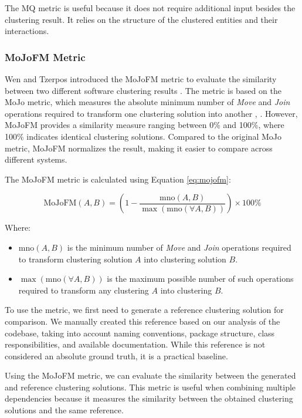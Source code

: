 \documentclass{ieeeaccess}
\begin{document}
The MQ metric is useful because it does not require additional input besides the clustering result. It relies on the structure of the clustered entities and their interactions.

\subsubsection{MoJoFM Metric}
\label{subsec:mojofm}
Wen and Tzerpos introduced the MoJoFM metric to evaluate the similarity between two different software clustering results \cite{mojofm}. The metric is based on the MoJo metric, which measures the absolute minimum number of \textit{Move} and \textit{Join} operations required to transform one clustering solution into another \cite{b3}, \cite{mojofm}. However, MoJoFM provides a similarity measure ranging between 0\% and 100\%, where 100\% indicates identical clustering solutions.
Compared to the original MoJo metric, MoJoFM normalizes the result, making it easier to compare across different systems.

The MoJoFM metric is calculated using Equation \eqref{eq:mojofm}:

\begin{equation}
\text{MoJoFM}(A, B) = \left(1 - \frac{\text{mno}(A, B)}{\max(\text{mno}(\forall A, B))}\right) \times 100\%
\label{eq:mojofm}
\end{equation}

Where:

\begin{itemize}
\item $\text{mno}(A, B)$ is the minimum number of \textit{Move} and \textit{Join} operations required to transform clustering solution $A$ into clustering solution $B$.
\item $\max(\text{mno}(\forall A, B))$ is the maximum possible number of such operations required to transform any clustering $A$ into clustering $B$.
\end{itemize}

To use the metric, we first need to generate a reference clustering solution for comparison. We manually created this reference based on our analysis of the codebase, taking into account naming conventions, package structure, class responsibilities, and available documentation. While this reference is not considered an absolute ground truth, it is a practical baseline.

Using the MoJoFM metric, we can evaluate the similarity between the generated and reference clustering solutions. This metric is useful when combining multiple dependencies because it measures the similarity between the obtained clustering solutions and the same reference.
\end{document}
